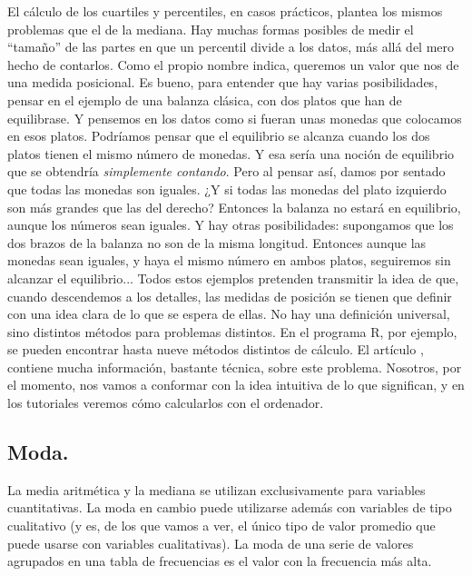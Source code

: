 El cálculo de los cuartiles y percentiles, en casos prácticos,  plantea los mismos problemas que el
de la mediana. Hay muchas formas posibles de medir el ``tamaño'' de las partes en que un percentil
divide a los datos, más allá del mero hecho de contarlos.  Como el propio nombre indica, queremos
un valor que nos de una medida posicional. Es bueno, para entender que hay varias posibilidades,
pensar en el ejemplo de una balanza clásica, con dos platos que han de equilibrase. Y pensemos en
los datos como si fueran unas monedas que colocamos en esos platos. Podríamos pensar que el
equilibrio se alcanza cuando los dos platos tienen el mismo número de monedas. Y esa sería una
noción de equilibrio que se obtendría {\em simplemente contando}. Pero al pensar así, damos por
sentado que todas las monedas son iguales. ¿Y si todas las monedas del plato izquierdo son más
grandes que las del derecho? Entonces la balanza no estará en equilibrio, aunque los números sean
iguales. Y hay otras posibilidades: supongamos que los dos brazos de la balanza no son de la misma
longitud. Entonces aunque las monedas sean iguales, y haya el mismo número en ambos platos,
seguiremos sin alcanzar el equilibrio... Todos estos ejemplos pretenden transmitir la idea de que,
cuando descendemos a los detalles, las medidas de posición se tienen que definir con una idea clara
de lo que se espera de ellas. No hay una definición universal, sino distintos métodos para
problemas distintos. En el programa R, por ejemplo, se pueden encontrar hasta nueve métodos distintos de
cálculo. El artículo \cite{hyndman1996sample}, contiene mucha información, bastante técnica, sobre
este problema. Nosotros, por el momento, nos vamos a conformar con la idea intuitiva de lo que
significan, y en los tutoriales veremos cómo calcularlos con el ordenador.

\subsection{Moda.}
\label{cap02:subsec:Moda}

La media aritmética y la mediana se utilizan exclusivamente para variables cuantitativas. La
moda en cambio puede utilizarse además con variables de tipo cualitativo (y es,
de los que vamos a ver, el único tipo de valor promedio que puede usarse con
variables cualitativas). {\sf La moda}  de una serie de valores
agrupados en una tabla de frecuencias es el valor con la frecuencia más alta.

